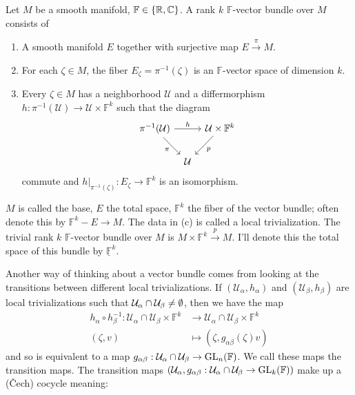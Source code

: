 \begin{definition}
  Let $M$ be a smooth manifold, $\mathbb{F}\in \left\{\mathbb{R},\mathbb{C}\right\} $. A rank $k$ $\mathbb{F}$-vector bundle over $M$ consists of 
  \begin{enumerate}
    \item A smooth manifold $E$ together with surjective map $E\xrightarrow{\pi}M$.
    \item For each $\zeta\in M$, the fiber $E_{\zeta}=\pi ^{-1}(\zeta)$ is an $\mathbb{F}$-vector space of dimension $k$.
    \item Every $\zeta \in M$ has a neighborhood $\mathcal{U}$ and a differmorphism $h:\pi^{-1}(\mathcal{U})\to \mathcal{U}\times  \mathbb{F}^{k}$ such that the diagram 
      \[
	\begin{tikzcd}[column sep=tiny]
	\pi^{-1}(\mathcal{U})\arrow[rr,"h"] \arrow[rd,"\pi"']  & & \mathcal{U}\times \mathbb{F}^{k}\arrow[ld, "p"] \\
	& \mathcal{U} &  
      \end{tikzcd}
      \] 
      commute and $h|_{\pi^{-1}(\zeta)}:E_{\zeta }\to \mathbb{F}^{k}$ is an isomorphism. 
  \end{enumerate}
  $M$ is called the base, $E$ the total space, $\mathbb{F}^{k}$ the fiber of the vector bundle; often denote this by $\mathbb{F}^{k}- E\to M$. The data in (c) is called a local trivialization. The trivial rank $k$ $\mathbb{F}$-vector bundle over $M$ is $M\times \mathbb{F}^{k}\xrightarrow{p} M$. I'll denote this the total space of this bundle by $\underline{\mathbb{F}}^{k}$. 
  
\end{definition}
Another way of thinking about a vector bundle comes from looking at the transitions between different local trivializations. If $\left( \mathcal{U}_{\alpha},h_{\alpha} \right) $ and $\left( \mathcal{U}_{\beta},h_{\beta } \right) $ are local trivializations such that $\mathcal{U}_{\alpha}\cap \mathcal{U}_\beta \neq \emptyset$, then we have the map  
\begin{align*}
  h_{\alpha}\circ h^{-1}_{\beta }: \mathcal{U}_\alpha \cap \mathcal{U}_\beta \times \mathbb{F}^{k} &\longrightarrow \mathcal{U}_{\alpha}\cap \mathcal{U}_\beta \times \mathbb{F}^{k} \\
  (\zeta,v) &\longmapsto (\zeta,g_{\alpha \beta }(\zeta)v)
\end{align*}
and so is equivalent to a map $g_{\alpha \beta }:\mathcal{U}_\alpha \cap \mathcal{U}_\beta \to \operatorname{GL}_n(\mathbb{F})$. We call these maps the transition maps. The transition maps $\left( \mathcal{U}_\alpha, g_{\alpha \beta }:\mathcal{U}_{\alpha}\cap \mathcal{U}_{\beta }\to \operatorname{GL}_k(\mathbb{F}) \right) $ make up a (\v{C}ech) cocycle meaning:

